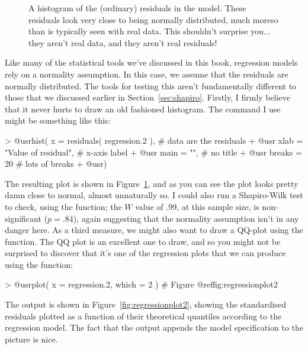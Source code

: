 
\begin{figure}
\begin{center}
\caption{A histogram of the (ordinary) residuals in the  model. These residuals look very close to being normally distributed, much moreso than is typically seen with real data. This shouldn't surprise you... they aren't real data, and they aren't real residuals!}
\HR
\label{fig:residhist}
\end{center}
\end{figure}


Like many of the statistical tools we've discussed in this book, regression models rely on a normality assumption. In this case, we assume that the residuals are normally distributed. The tools for testing this aren't fundamentally different to those that we discussed earlier in Section~\ref{sec:shapiro}. Firstly, I firmly believe that it never hurts to draw an old fashioned histogram. The command I use might be something like this:

\begin{rblock1}
> @usr{hist( x = residuals( regression.2 ),}   # data are the residuals
+ @usr{      xlab = "Value of residual",}      # x-axis label
+ @usr{      main = "",   }                    # no title 
+ @usr{      breaks = 20  }                    # lots of breaks
+ @usr{)}
\end{rblock1}
The resulting plot is shown in Figure~\ref{fig:residhist}, and as you can see the plot looks pretty damn close to normal, almost unnaturally so. I could also run a Shapiro-Wilk test  to check, using the  function; the $W$ value of .99, at this sample size, is non-significant ($p=.84$), again suggesting that the normality assumption isn't in any danger here. As a third measure, we might also want to draw a QQ-plot using the  function. The QQ plot is an excellent one to draw, and so you might not be surprised to discover that it's one of the regression plots that we can produce using the  function:
\begin{rblock1}
> @usr{plot( x = regression.2, which = 2 )}   # Figure @ref{fig:regressionplot2}
\end{rblock1}
The output is shown in Figure~\ref{fig:regressionplot2}, showing the standardised residuals plotted as a function of their theoretical quantiles according to the regression model. The fact that the output appends the model specification to the picture is nice. 

